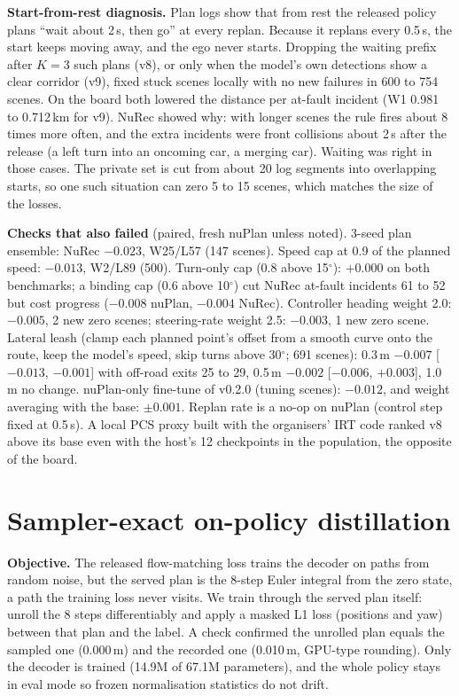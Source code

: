 \documentclass{article}
\begin{document}
\textbf{Start-from-rest diagnosis.} Plan logs show that from rest the released policy plans ``wait about 2\,s, then
go'' at every replan. Because it replans every 0.5\,s, the start keeps moving away, and the ego never starts.
Dropping the waiting prefix after $K=3$ such plans (v8), or only when the model's own detections show a clear
corridor (v9), fixed stuck scenes locally with no new failures in 600 to 754 scenes. On the board both lowered the
distance per at-fault incident (W1 0.981 to 0.712\,km for v9). NuRec showed why: with longer scenes the rule fires
about 8 times more often, and the extra incidents were front collisions about 2\,s after the release (a left turn
into an oncoming car, a merging car). Waiting was right in those cases. The private set is cut from about 20 log
segments into overlapping starts, so one such situation can zero 5 to 15 scenes, which matches the size of the
losses.

\textbf{Checks that also failed} (paired, fresh nuPlan unless noted). 3-seed plan ensemble: NuRec $-0.023$,
W25/L57 (147 scenes). Speed cap at 0.9 of the planned speed: $-0.013$, W2/L89 (500). Turn-only cap (0.8 above
15$^\circ$): $+0.000$ on both benchmarks; a binding cap (0.6 above 10$^\circ$) cut NuRec at-fault incidents 61 to
52 but cost progress ($-0.008$ nuPlan, $-0.004$ NuRec). Controller heading weight 2.0: $-0.005$, 2 new zero
scenes; steering-rate weight 2.5: $-0.003$, 1 new zero scene. Lateral leash (clamp each planned point's offset from a
smooth curve onto the route, keep the model's speed, skip turns above 30$^\circ$; 691 scenes): 0.3\,m $-0.007$
[$-0.013$, $-0.001$] with off-road exits 25 to 29, 0.5\,m $-0.002$ [$-0.006$, $+0.003$], 1.0\,m no change. nuPlan-only fine-tune of v0.2.0 (tuning scenes): $-0.012$, and
weight averaging with the base: $\pm0.001$. Replan rate is a no-op on nuPlan (control step fixed at 0.5\,s). A local
PCS proxy built with the organisers' IRT code ranked v8 above its base even with the host's 12 checkpoints in the
population, the opposite of the board.

\section{Sampler-exact on-policy distillation}
\label{sec:dagger}
\textbf{Objective.} The released flow-matching loss trains the decoder on paths from random noise, but the served
plan is the 8-step Euler integral from the zero state, a path the training loss never visits. We train through the
served plan itself: unroll the 8 steps differentiably and apply a masked L1 loss (positions and yaw) between that
plan and the label. A check confirmed the unrolled plan equals the sampled one (0.000\,m) and the recorded one
(0.010\,m, GPU-type rounding). Only the decoder is trained (14.9M of 67.1M parameters), and the whole policy stays
in eval mode so frozen normalisation statistics do not drift.
\end{document}
